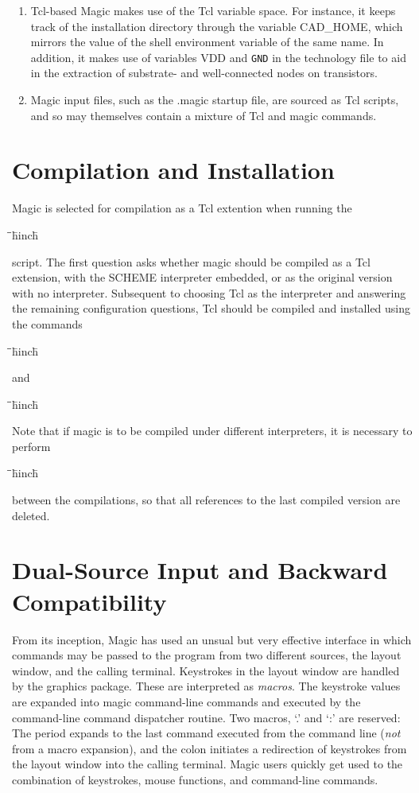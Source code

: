 \documentclass[letterpaper,twoside,12pt]{article}
\def\hinch{\hspace*{0.5in}}
\def\starti{\begin{center}\begin{tabbing}\hinch\=\hinch\=\hinch\=hinch\hinch\=\kill}
\def\endi{\end{tabbing}\end{center}}
\def\ii{\>\>\>}
\begin{document}
\begin{enumerate}
   \item Tcl-based Magic makes use of the Tcl variable space.  For
	instance, it keeps track of the installation directory
	through the variable {\ttfamily CAD\_HOME}, which mirrors
	the value of the shell environment variable of the same
	name.  In addition, it makes use of variables {\ttfamily
	VDD} and {\tt GND} in the technology file to aid in the
	extraction of substrate- and well-connected nodes on
	transistors.

   \item Magic input files, such as the {\ttfamily .magic} startup
	file, are sourced as Tcl scripts, and so may themselves
	contain a mixture of Tcl and magic commands.

\end{enumerate}

\section{Compilation and Installation}

   Magic is selected for compilation as a Tcl extention when running
   the 
   \starti
      \ii {\bfseries make config}
   \endi
   script.  The first question asks whether magic should be compiled
   as a Tcl extension, with the SCHEME interpreter embedded, or as
   the original version with no interpreter.  Subsequent to choosing
   Tcl as the interpreter and answering the remaining configuration
   questions, Tcl should be compiled and installed using the commands
   \starti
      \ii {\bfseries make tcl}
   \endi
   and
   \starti
      \ii {\bfseries make install-tcl}
   \endi
   Note that if magic is to be compiled under different interpreters,
   it is necessary to perform
   \starti
      \ii {\bfseries make clean}
   \endi
   between the compilations, so that all references to the last
   compiled version are deleted.

\section{Dual-Source Input and Backward Compatibility}

From its inception, Magic has used an unsual but very effective interface
in which commands may be passed to the program from two different sources,
the layout window, and the calling terminal.  Keystrokes in the layout
window are handled by the graphics package.  These are interpreted as
{\itshape macros}.  The keystroke values are expanded into magic command-line
commands and executed by the command-line command dispatcher routine.  Two
macros, `{\ttfamily .}' and `{\ttfamily :}' are reserved:  The period
expands to the last command executed from the command line ({\itshape not}
from a macro expansion), and the colon initiates a redirection of keystrokes
from the layout window into the calling terminal.  Magic users quickly
get used to the combination of keystrokes, mouse functions, and
command-line commands.
\end{document}
